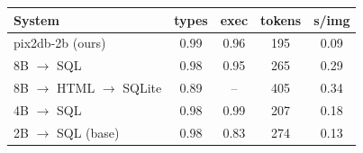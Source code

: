 \begin{tabular}{lcccc}
\toprule
System & types & exec & tokens & s/img \\
\midrule
pix2db-2b (ours) & 0.99 & 0.96 & 195 & 0.09 \\
8B $\to$ SQL & 0.98 & 0.95 & 265 & 0.29 \\
8B $\to$ HTML $\to$ SQLite & 0.89 & -- & 405 & 0.34 \\
4B $\to$ SQL & 0.98 & 0.99 & 207 & 0.18 \\
2B $\to$ SQL (base) & 0.98 & 0.83 & 274 & 0.13 \\
\bottomrule
\end{tabular}